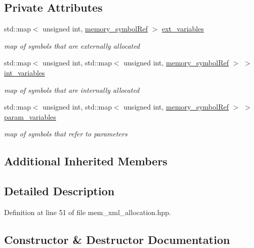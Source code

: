 \subsection*{Private Attributes}
\begin{DoxyCompactItemize}
\item 
std\+::map$<$ unsigned int, \hyperlink{memory__symbol_8hpp_af3608dbc27177447c2d777fa712cc82a}{memory\+\_\+symbol\+Ref} $>$ \hyperlink{classmem__xml__allocation_adaba8adf5c7edb3c376325bbeb90adf6}{ext\+\_\+variables}
\begin{DoxyCompactList}\small\item\em map of symbols that are externally allocated \end{DoxyCompactList}\item 
std\+::map$<$ unsigned int, std\+::map$<$ unsigned int, \hyperlink{memory__symbol_8hpp_af3608dbc27177447c2d777fa712cc82a}{memory\+\_\+symbol\+Ref} $>$ $>$ \hyperlink{classmem__xml__allocation_a4acb07a082d8ad97b91247f8963f210e}{int\+\_\+variables}
\begin{DoxyCompactList}\small\item\em map of symbols that are internally allocated \end{DoxyCompactList}\item 
std\+::map$<$ unsigned int, std\+::map$<$ unsigned int, \hyperlink{memory__symbol_8hpp_af3608dbc27177447c2d777fa712cc82a}{memory\+\_\+symbol\+Ref} $>$ $>$ \hyperlink{classmem__xml__allocation_ad5160a42b79b58420e6686ce43f567f2}{param\+\_\+variables}
\begin{DoxyCompactList}\small\item\em map of symbols that refer to parameters \end{DoxyCompactList}\end{DoxyCompactItemize}
\subsection*{Additional Inherited Members}


\subsection{Detailed Description}


Definition at line 51 of file mem\+\_\+xml\+\_\+allocation.\+hpp.



\subsection{Constructor \& Destructor Documentation}
\mbox{\label{classmem__xml__allocation_aae45922d425552e133c3e71339b54ad0}} 
